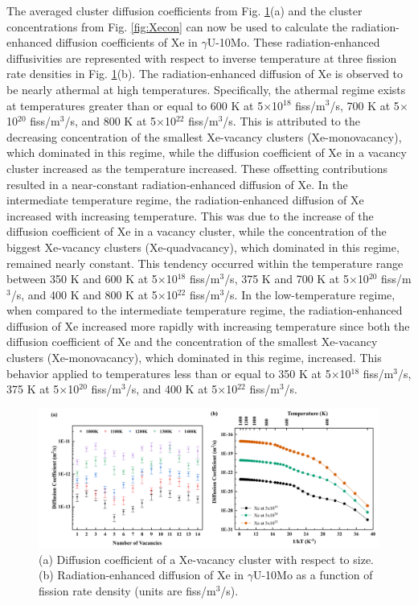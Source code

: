 \documentclass[preprint,12pt]{elsarticle}
\begin{document}
\indent The averaged cluster diffusion coefficients from Fig.  \ref{fig:Xediff}(a) and the cluster concentrations from Fig. \ref{fig:Xecon} can now be used to calculate the radiation-enhanced diffusion coefficients of Xe in $\gamma$U-10Mo. These radiation-enhanced diffusivities are represented with respect to inverse temperature at three fission rate densities in Fig. \ref{fig:Xediff}(b). The radiation-enhanced diffusion of Xe is observed to be nearly athermal at high temperatures. Specifically, the athermal regime exists at temperatures greater than or equal to 600 K at 5$\times$10$^{18}$ fiss/m$^{3}$/s, 700 K at 5$\times$10$^{20}$ fiss/m$^{3}$/s, and 800 K at 5$\times$10$^{22}$ fiss/m$^{3}$/s. This is attributed to the decreasing concentration of the smallest Xe-vacancy clusters (Xe-monovacancy), which dominated in this regime, while the diffusion coefficient of Xe in a vacancy cluster increased as the temperature increased. These offsetting contributions resulted in a near-constant radiation-enhanced diffusion of Xe. In the intermediate temperature regime, the radiation-enhanced diffusion of Xe increased with increasing temperature. This was due to the increase of the diffusion coefficient of Xe in a vacancy cluster, while the concentration of the biggest Xe-vacancy clusters (Xe-quadvacancy), which dominated in this regime, remained nearly constant. This tendency  occurred within the temperature range between 350 K and 600 K at 5$\times$10$^{18}$ fiss/m$^{3}$/s, 375 K and 700 K at 5$\times$10$^{20}$ fiss/m$^{3}$/s, and 400 K and 800 K at 5$\times$10$^{22}$ fiss/m$^{3}$/s. In the low-temperature regime, when compared to the intermediate temperature regime, the radiation-enhanced diffusion of Xe increased more rapidly with increasing temperature since both the diffusion coefficient of Xe and the concentration of the smallest Xe-vacancy clusters (Xe-monovacancy), which dominated in this regime, increased. This behavior applied to temperatures less than or equal to 350 K at 5$\times$10$^{18}$ fiss/m$^{3}$/s, 375 K at 5$\times$10$^{20}$ fiss/m$^{3}$/s, and 400 K at 5$\times$10$^{22}$ fiss/m$^{3}$/s.\\

\begin{figure}[hbt!]
\centering
\includegraphics[width=1\textwidth]{Fig9.png}
\caption{(a) Diffusion coefficient of a Xe-vacancy cluster with respect to size. (b) Radiation-enhanced diffusion of Xe in $\gamma$U-10Mo as a function of fission rate density (units are fiss/m$^{3}$/s). }
\label{fig:Xediff}
\end{figure}
\end{document}
